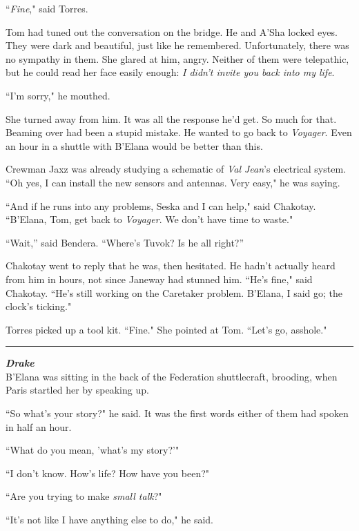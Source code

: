 \documentclass[twoside,letterpaper,12pt]{memoir}
\begin{document}
``\textit{Fine}," said Torres.

Tom had tuned out the conversation on the bridge. He and A'Sha locked eyes. They were dark and beautiful, just like he remembered. Unfortunately, there was no sympathy in them. She glared at him, angry. Neither of them were telepathic, but he could read her face easily enough: \textit{I didn't invite you back into my life}.

``I'm sorry," he mouthed.

She turned away from him. It was all the response he'd get. So much for that. Beaming over had been a stupid mistake. He wanted to go back to \textit{Voyager}. Even an hour in a shuttle with B'Elana would be better than this.

Crewman Jaxz was already studying a schematic of \textit{Val Jean}'s electrical system. ``Oh yes, I can install the new sensors and antennas. Very easy," he was saying.

``And if he runs into any problems, Seska and I can help," said Chakotay. ``B'Elana, Tom, get back to \textit{Voyager}. We don't have time to waste."

``Wait,” said Bendera. ``Where’s Tuvok? Is he all right?”

Chakotay went to reply that he was, then hesitated. He hadn’t actually heard from him in hours, not since Janeway had stunned him. ``He's fine," said Chakotay. ``He's still working on the Caretaker problem. B'Elana, I said go; the clock's ticking."

Torres picked up a tool kit. ``Fine." She pointed at Tom. ``Let's go, asshole."

\begin{center}\rule{3cm}{0.4 pt}\end{center}

\noindent\textit{\textbf{Drake}}\\

B'Elana was sitting in the back of the Federation shuttlecraft, brooding, when Paris startled her by speaking up.

``So what's your story?" he said. It was the first words either of them had spoken in half an hour.

``What do you mean, 'what's my story?'"

``I don't know. How's life? How have you been?"

``Are you trying to make \textit{small talk}?"

``It's not like I have anything else to do," he said.
\end{document}
